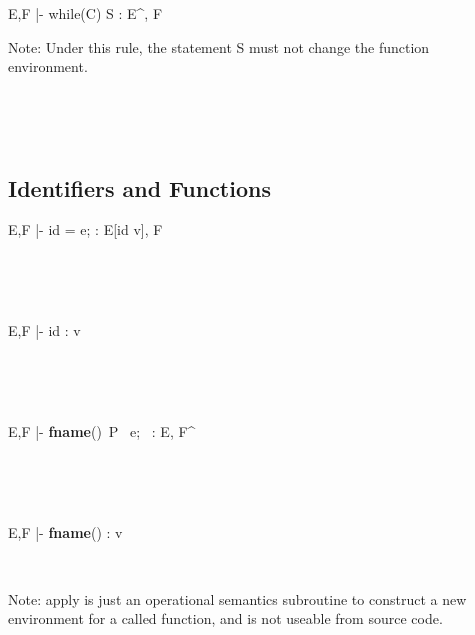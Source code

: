 \documentclass[12pt,letterpaper]{article}
\begin{document}
		   
\

\
 


		   {E,F |- {while}(C)  S  : E^{\prime\prime}, F}	  
		   
Note: Under this rule, the statement S must not change the function environment.


\ 

\

\subsection{Identifiers and Functions}

		   {E,F |- id = e; : E[id \leftarrow v], F}
		   
		   
\ 

\ 

		   {E,F |- id : v}
		   
\

\

		   
{E,F |-  \textbf{fname}()\ P\  e;\  : E, F^\prime}
		   
\

\

{E,F |- \textbf{fname}() : v}


\

Note: apply is just an operational semantics subroutine to construct a new environment for a called function, and is not useable from source code.


\
\end{document}
